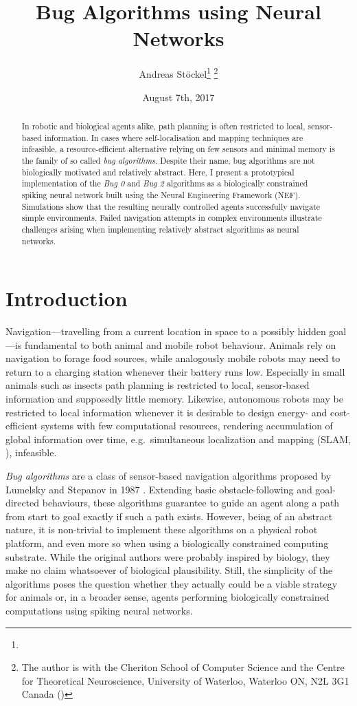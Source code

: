 \documentclass[letterpaper,10pt,conference]{ieeeconf}
\title{Bug Algorithms using Neural Networks}
\date{August 7th, 2017}
\author{Andreas Stöckel\thanks{}
  \thanks{The author is with the Cheriton School of Computer Science and the Centre for Theoretical Neuroscience, University of Waterloo, Waterloo ON, N2L 3G1
    Canada  (\you)}}
\begin{document}
\maketitle

\begin{abstract}
In robotic and biological agents alike, path planning is often restricted to local, sensor-based information. In cases where self-localisation and mapping techniques are infeasible, a resource-efficient alternative relying on few sensors and minimal memory is the family of so called \emph{bug algorithms}. Despite their name, bug algorithms are not biologically motivated and relatively abstract. Here, I present a prototypical implementation of the \emph{Bug 0} and \emph{Bug 2} algorithms as a biologically constrained spiking neural network built using the Neural Engineering Framework (NEF). Simulations show that the resulting neurally controlled agents successfully navigate simple environments. Failed navigation attempts in complex environments illustrate challenges arising when implementing relatively abstract algorithms as neural networks.
\end{abstract}

\section{Introduction}

Navigation---travelling from a current location in space to a possibly hidden goal---is fundamental to both animal and mobile robot behaviour. Animals rely on navigation to forage food sources, while analogously mobile robots may need to return to a charging station whenever their battery runs low. Especially in small animals such as insects path planning is restricted to local, sensor-based information and supposedly little memory. Likewise, autonomous robots may be restricted to local information whenever it is desirable to design energy- and cost-efficient systems with few computational resources, rendering accumulation of global information over time, e.g.~simultaneous localization and mapping (SLAM, \cite{thrun2002probabilistic}), infeasible.

\emph{Bug algorithms} are a class of sensor-based navigation algorithms proposed by Lumelsky and Stepanov in 1987 \cite{lumelsky1987path}. Extending basic obstacle-following and goal-directed behaviours, these algorithms guarantee to guide an agent along a path from start to goal exactly if such a path exists. However, being of an abstract nature, it is non-trivial to implement these algorithms on a physical robot platform, and even more so when using a biologically constrained computing substrate. While the original authors were probably inspired by biology, they make no claim whatsoever of biological plausibility. Still, the simplicity of the algorithms poses the question whether they actually could be a viable strategy for animals or, in a broader sense, agents performing biologically constrained computations using spiking neural networks.
\end{document}

